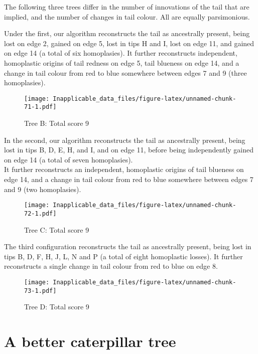 \documentclass[]{book}
\theoremstyle{definition}
\theoremstyle{definition}
\theoremstyle{definition}
\theoremstyle{remark}
\begin{document}
The following three trees differ in the number of innovations of the
tail that are implied, and the number of changes in tail colour. All are
equally parsimonious.

Under the first, our algorithm reconstructs the tail as ancestrally
present, being lost on edge 2, gained on edge 5, lost in tips H and I,
lost on edge 11, and gained on edge 14 (a total of six homoplasies). It
further reconstructs independent, homoplastic origins of tail redness on
edge 5, tail blueness on edge 14, and a change in tail colour from red
to blue somewhere between edges 7 and 9 (three homoplasies).

\begin{figure}
\centering
\texttt{[image: Inapplicable\_data\_files/figure-latex/unnamed-chunk-71-1.pdf]}
\caption{\label{fig:unnamed-chunk-71}Tree B: Total score 9}
\end{figure}

In the second, our algorithm reconstructs the tail as ancestrally
present, being lost in tips B, D, E, H, and I, and on edge 11, before
being independently gained on edge 14 (a total of seven homoplasies).\\
It further reconstructs an independent, homoplastic origins of tail
blueness on edge 14, and a change in tail colour from red to blue
somewhere between edges 7 and 9 (two homoplasies).

\begin{figure}
\centering
\texttt{[image: Inapplicable\_data\_files/figure-latex/unnamed-chunk-72-1.pdf]}
\caption{\label{fig:unnamed-chunk-72}Tree C: Total score 9}
\end{figure}

The third configuration reconstructs the tail as ancestrally present,
being lost in tips B, D, F, H, J, L, N and P (a total of eight
homoplastic losses). It further reconstructs a single change in tail
colour from red to blue on edge 8.

\begin{figure}
\centering
\texttt{[image: Inapplicable\_data\_files/figure-latex/unnamed-chunk-73-1.pdf]}
\caption{\label{fig:unnamed-chunk-73}Tree D: Total score 9}
\end{figure}

\hypertarget{a-better-caterpillar-tree}{%
\section{A better caterpillar tree}\label{a-better-caterpillar-tree}}
\end{document}
